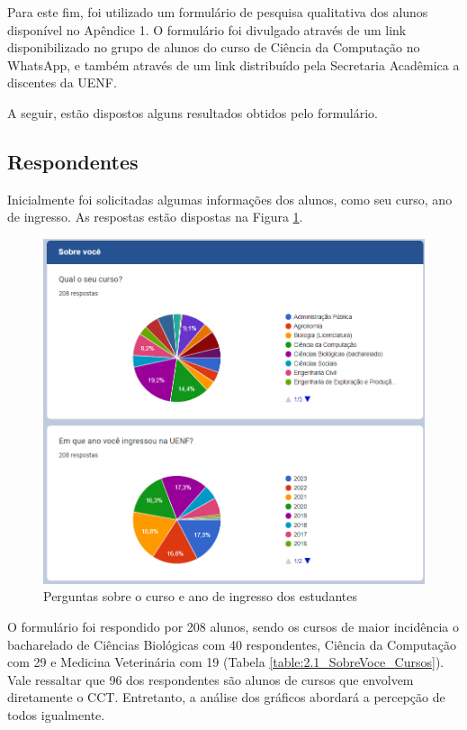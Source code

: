 Para este fim, foi utilizado um formulário de pesquisa qualitativa dos alunos disponível no Apêndice 1. O formulário foi divulgado através de um link disponibilizado no grupo de alunos do curso de Ciência da Computação no WhatsApp, e também através de um link distribuído pela Secretaria Acadêmica a discentes da UENF.

A seguir, estão dispostos alguns resultados obtidos pelo formulário.

\subsection{Respondentes} %

Inicialmente foi solicitadas algumas informações dos alunos, como seu curso, ano de ingresso. As respostas estão dispostas na Figura \ref{fig:2.0-SobreVoce}.

\begin{figure}[htbp]\centering
  \caption{\label{fig:2.0-SobreVoce}Perguntas sobre o curso e ano de ingresso dos estudantes}
  \includegraphics[scale=0.8]{files/img/Forms/2.0-SobreVoce.png}
\end{figure} %

O formulário foi respondido por 208 alunos, sendo os cursos de maior incidência o bacharelado de Ciências Biológicas com 40 respondentes, Ciência da Computação com 29 e Medicina Veterinária com 19 (Tabela \ref{table:2.1_SobreVoce_Cursos}). Vale ressaltar que 96 dos respondentes são alunos de cursos que envolvem diretamente o CCT. Entretanto, a análise dos gráficos abordará a percepção de todos igualmente.

